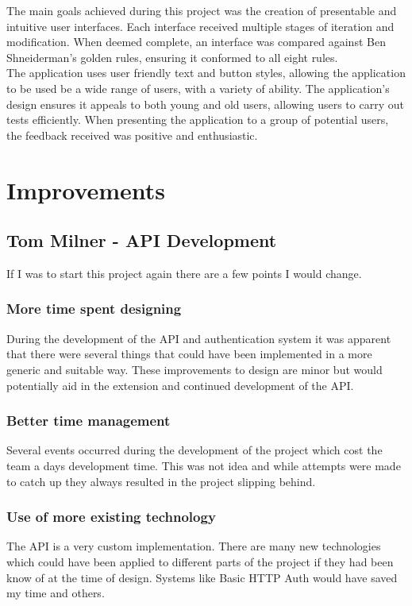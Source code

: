 \documentclass[11pt,a4paper]{report}
\begin{document}
The main goals achieved during this project was the creation of presentable and intuitive user interfaces. Each interface received multiple stages of iteration and modification. When deemed complete, an interface was compared against Ben Shneiderman's golden rules, ensuring it conformed to all eight rules.\\

The application uses user friendly text and button styles, allowing the application to be used be a wide range of users, with a variety of ability. The application's design ensures it appeals to both young and old users, allowing users to carry out tests efficiently. When presenting the application to a group of potential users, the feedback received was positive and enthusiastic.

\section{Improvements}
\label{sec:improvements}
\subsection{Tom Milner - API Development}

If I was to start this project again there are a few points I would change. 

\subsubsection{More time spent designing}
During the development of the API and authentication system it was apparent that there were several things that could have been implemented in a more generic and suitable way. These improvements to design are minor but would potentially aid in the extension and continued development of the API. 

\subsubsection{Better time management}
Several events occurred during the development of the project which cost the team a days development time. This was not idea and while attempts were made to catch up they always resulted in the project slipping behind.

\subsubsection{Use of more existing technology}
The API is a very custom implementation. There are many new technologies which could have been applied to different parts of the project if they had been know of at the time of design. Systems like Basic HTTP Auth would have saved my time and others. 
\end{document}
